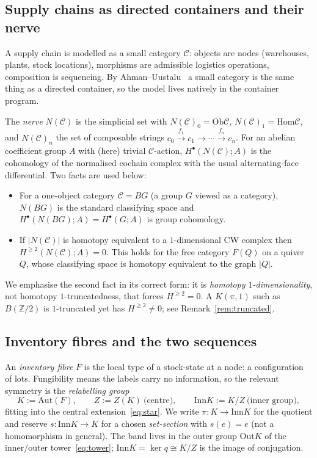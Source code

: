 \documentclass[11pt]{article}
\theoremstyle{definition}
\newcommand{\C}{\mathcal{C}}
\newcommand{\Ob}{\mathrm{Ob}}
\newcommand{\Hom}{\mathrm{Hom}}
\newcommand{\Z}{\mathbb{Z}}
\newcommand{\Aut}{\mathrm{Aut}}
\newcommand{\Inn}{\mathrm{Inn}}
\newcommand{\Out}{\mathrm{Out}}
\newcommand{\Zc}{Z}
\begin{document}
\subsection{Supply chains as directed containers and their nerve}

A supply chain is modelled as a small category $\C$: objects are nodes (warehouses, plants,
stock locations), morphisms are admissible logistics operations, composition is sequencing. By
Ahman--Uustalu~\cite{au-dccat} a small category is the same thing as a directed container, so the
model lives natively in the container program.

The \emph{nerve} $N(\C)$ is the simplicial set with $N(\C)_0=\Ob\C$, $N(\C)_1=\Hom\C$, and
$N(\C)_n$ the set of composable strings $c_0\xrightarrow{f_1}c_1\to\cdots\xrightarrow{f_n}c_n$.
For an abelian coefficient group $A$ with (here) trivial $\C$-action, $H^\bullet(N(\C);A)$ is the
cohomology of the normalised cochain complex with the usual alternating-face differential. Two
facts are used below:
\begin{itemize}
\item For a one-object category $\C=BG$ (a group $G$ viewed as a category), $N(BG)$ is the
standard classifying space and $H^\bullet(N(BG);A)=H^\bullet(G;A)$ is group cohomology.
\item If $|N(\C)|$ is homotopy equivalent to a $1$-dimensional CW complex then
$H^{\ge2}(N(\C);A)=0$. This holds for the free category $F(Q)$ on a quiver $Q$, whose classifying
space is homotopy equivalent to the graph $|Q|$.
\end{itemize}
We emphasise the second fact in its correct form: it is \emph{homotopy $1$-dimensionality}, not
homotopy $1$-truncatedness, that forces $H^{\ge2}=0$. A $K(\pi,1)$ such as $B(\Z/2)$ is
$1$-truncated yet has $H^{\ge2}\ne0$; see Remark~\ref{rem:truncated}.

\subsection{Inventory fibres and the two sequences}\label{sec:prelim-ext}

An \emph{inventory fibre} $F$ is the local type of a stock-state at a node: a configuration of
lots. Fungibility means the labels carry no information, so the relevant symmetry is the
\emph{relabelling group}
\[
K:=\Aut(F),\qquad \Zc:=Z(K)\ \text{(centre)},\qquad \Inn K:=K/\Zc\ \text{(inner group)},
\]
fitting into the central extension~\eqref{eq:star}. We write $\pi:K\to\Inn K$ for the quotient
and reserve $s:\Inn K\to K$ for a chosen \emph{set-section} with $s(e)=e$ (not a homomorphism in
general). The band lives in the outer group $\Out K$ of the inner/outer
tower~\eqref{eq:tower}; $\Inn K=\ker q\cong K/\Zc$ is the image of conjugation.
\end{document}
